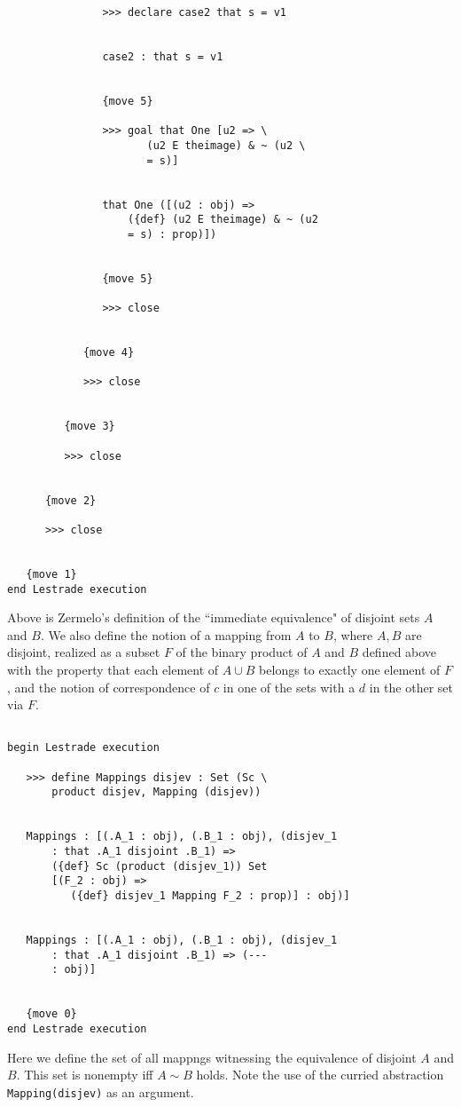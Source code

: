 \documentclass[12pt]{article}
\begin{document}
\begin{verbatim}
               >>> declare case2 that s = v1


               case2 : that s = v1


               {move 5}

               >>> goal that One [u2 => \
                      (u2 E theimage) & ~ (u2 \
                      = s)]


               that One ([(u2 : obj) => 
                   ({def} (u2 E theimage) & ~ (u2 
                   = s) : prop)])


               {move 5}

               >>> close


            {move 4}

            >>> close


         {move 3}

         >>> close


      {move 2}

      >>> close


   {move 1}
end Lestrade execution
\end{verbatim}

Above is Zermelo's definition of the ``immediate equivalence" of disjoint sets $A$ and $B$.  We also define the notion of a mapping from $A$ to $B$, where $A,B$ are disjoint, 
realized as a subset $F$ of the binary product of $A$ and $B$ defined above with the property that each element of $A \cup B$ belongs to exactly one element of $F$, and the notion of correspondence of $c$ in one of the sets with a $d$ in the other set via $F$.

\begin{verbatim}

begin Lestrade execution

   >>> define Mappings disjev : Set (Sc \
       product disjev, Mapping (disjev))


   Mappings : [(.A_1 : obj), (.B_1 : obj), (disjev_1 
       : that .A_1 disjoint .B_1) => 
       ({def} Sc (product (disjev_1)) Set 
       [(F_2 : obj) => 
          ({def} disjev_1 Mapping F_2 : prop)] : obj)]


   Mappings : [(.A_1 : obj), (.B_1 : obj), (disjev_1 
       : that .A_1 disjoint .B_1) => (--- 
       : obj)]


   {move 0}
end Lestrade execution
\end{verbatim}

Here we define the set of all mappngs witnessing the equivalence of disjoint $A$ and $B$.  This set is nonempty iff $A \sim B$ holds.  Note the use of the curried abstraction
{\tt Mapping(disjev)} as an argument.
\end{document}
